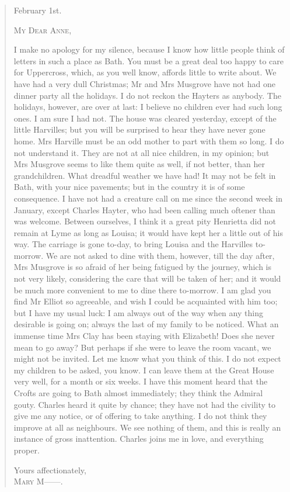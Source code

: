 \begin{quotation}

\begin{flushright}
February 1st.
\end{flushright}

\noindent\textsc{My Dear Anne,}

I make no apology for my silence, because I know how little people think of letters in such a place as Bath. You must be a great deal too happy to care for Uppercross, which, as you well know, affords little to write about. We have had a very dull Christmas; Mr and Mrs Musgrove have not had one dinner party all the holidays. I do not reckon the Hayters as anybody. The holidays, however, are over at last: I believe no children ever had such long ones. I am sure I had not. The house was cleared yesterday, except of the little Harvilles; but you will be surprised to hear they have never gone home. Mrs Harville must be an odd mother to part with them so long. I do not understand it. They are not at all nice children, in my opinion; but Mrs Musgrove seems to like them quite as well, if not better, than her grandchildren. What dreadful weather we have had! It may not be felt in Bath, with your nice pavements; but in the country it is of some consequence. I have not had a creature call on me since the second week in January, except Charles Hayter, who had been calling much oftener than was welcome. Between ourselves, I think it a great pity Henrietta did not remain at Lyme as long as Louisa; it would have kept her a little out of his way. The carriage is gone to-day, to bring Louisa and the Harvilles to-morrow. We are not asked to dine with them, however, till the day after, Mrs Musgrove is so afraid of her being fatigued by the journey, which is not very likely, considering the care that will be taken of her; and it would be much more convenient to me to dine there to-morrow. I am glad you find Mr Elliot so agreeable, and wish I could be acquainted with him too; but I have my usual luck: I am always out of the way when any thing desirable is going on; always the last of my family to be noticed. What an immense time Mrs Clay has been staying with Elizabeth! Does she never mean to go away? But perhaps if she were to leave the room vacant, we might not be invited. Let me know what you think of this. I do not expect my children to be asked, you know. I can leave them at the Great House very well, for a month or six weeks. I have this moment heard that the Crofts are going to Bath almost immediately; they think the Admiral gouty. Charles heard it quite by chance; they have not had the civility to give me any notice, or of offering to take anything. I do not think they improve at all as neighbours. We see nothing of them, and this is really an instance of gross inattention. Charles joins me in love, and everything proper. 

\begin{flushright}
Yours affectionately,\\
\textsc{Mary M——.}
\end{flushright}
\end{quotation}

